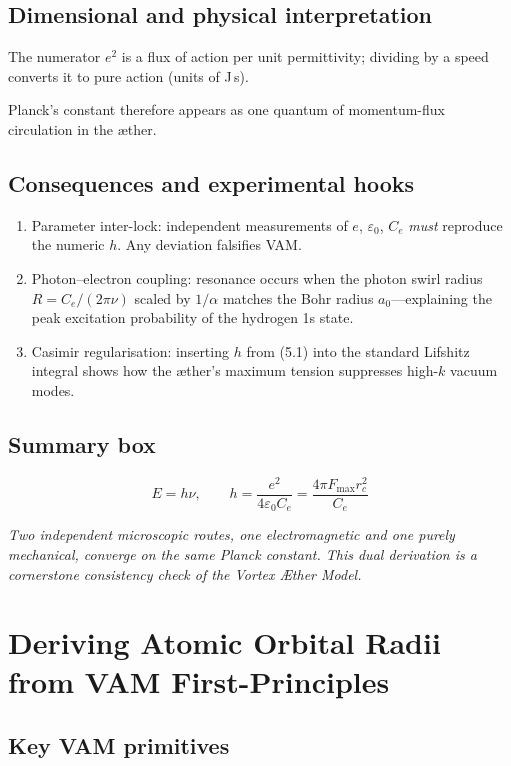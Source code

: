 \documentclass[a4paper,12pt]{article}
\begin{document}
\subsection{Dimensional and physical interpretation}

The numerator $e^{2}$ is a flux of action per unit permittivity; dividing by a speed converts it to pure action (units of J\,s).

Planck’s constant therefore appears as one quantum of momentum-flux circulation in the æther.

\subsection{Consequences and experimental hooks}

\begin{enumerate}
    \item Parameter inter-lock: independent measurements of $e$, $\varepsilon_0$, $C_e$ \textit{must} reproduce the numeric $h$. Any deviation falsifies VAM.
    \item Photon--electron coupling: resonance occurs when the photon swirl radius $R = C_e/(2\pi\nu)$ scaled by $1/\alpha$ matches the Bohr radius $a_0$---explaining the peak excitation probability of the hydrogen 1s state.
    \item Casimir regularisation: inserting $h$ from (5.1) into the standard Lifshitz integral shows how the æther’s maximum tension suppresses high-$k$ vacuum modes.
\end{enumerate}

\subsection{Summary box}

\[
    \boxed{
        E = h\nu,\qquad
        h = \frac{e^{2}}{4\varepsilon_0 C_e} = \frac{4\pi F_{\max} r_c^{2}}{C_e}
    }
\]

\textit{Two independent microscopic routes, one electromagnetic and one purely mechanical, converge on the same Planck constant. This dual derivation is a cornerstone consistency check of the Vortex Æther Model.}


\section{Deriving Atomic Orbital Radii from VAM First-Principles}

\subsection{Key VAM primitives}
\end{document}
